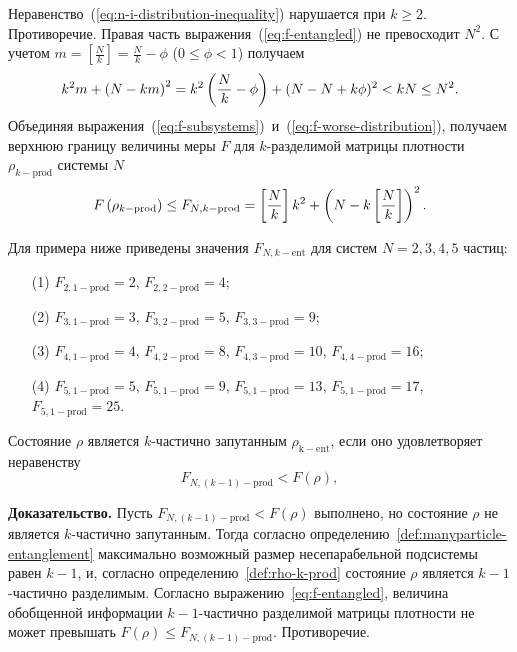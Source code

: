 %
Неравенство~(\ref{eq:n-i-distribution-inequality}) нарушается при $k \geq 2$. Противоречие.
Правая часть выражения~(\ref{eq:f-entangled}) не превосходит $N^2$.
С учетом
$m = \left[\frac{N}{k}\right] = \frac{N}{k} -\phi$ ($0 \leq \phi < 1$)
получаем
%
\begin{equation}
  k^2m + \left( N-km \right)^2
  = k^2\left(\frac{N}{k} - \phi\right) + (N - N +k\phi)^2  < kN \leq N^2.
\end{equation}
%
Объединяя выражения~(\ref{eq:f-subsystems})~и~(\ref{eq:f-worse-distribution}),
получаем верхнюю границу величины меры $F$ для $k$-разделимой матрицы плотности $\rho_{k-\mathrm{prod}}$ системы $N$
%
\begin{equation}\label{eq:f-entangled}
  F\left( \rho_{k-\mathrm{prod}} \right)
  \leq F_{N, k-\mathrm{prod}}
  = \left[ \frac N k \right] k^2 + \left(N - k \left[ \frac N k \right]\right)^2.
\end{equation}
%


Для примера ниже приведены значения $F_{N, k-\mathrm{ent}}$
для систем $N = 2, 3, 4, 5$ частиц:
\begin{itemize}
  \item[(1)]
    $F_{2, 1-\mathrm{prod}}= 2$,
    $F_{2, 2-\mathrm{prod}}= 4$;
  \item[(2)]
    $F_{3, 1-\mathrm{prod}}= 3$,
    $F_{3, 2-\mathrm{prod}}= 5$,
    $F_{3, 3-\mathrm{prod}}= 9$;
  \item[(3)]
    $F_{4, 1-\mathrm{prod}}= 4$,
    $F_{4, 2-\mathrm{prod}}= 8$,
    $F_{4, 3-\mathrm{prod}}= 10$,
    $F_{4, 4-\mathrm{prod}}= 16$;
  \item[(4)]
    $F_{5, 1-\mathrm{prod}}= 5$,
    $F_{5, 1-\mathrm{prod}}= 9$,
    $F_{5, 1-\mathrm{prod}}= 13$,
    $F_{5, 1-\mathrm{prod}}= 17$,
    $F_{5, 1-\mathrm{prod}}= 25$.
\end{itemize}


\begin{theorem}\label{th:entanglement-criteria}
  Состояние $\rho$ является $k$-частично запутанным $\rho_\mathrm{k-ent}$,
  если оно удовлетворяет неравенству
  \begin{equation}\label{eq:entanglement-criteria}
    F_{N, (k-1)-\mathrm{prod}} < F(\rho),
  \end{equation}
\end{theorem}
\textbf{Доказательство.}
Пусть $F_{N, (k-1)-\mathrm{prod}} < F(\rho)$ выполнено,
но состояние $\rho$ не является $k$-частично запутанным.
Тогда согласно определению~\ref{def:manyparticle-entanglement} максимально возможный размер несепарабельной подсистемы равен  $k-1$,
и,
согласно определению~\ref{def:rho-k-prod} состояние $\rho$ является $k-1$-частично разделимым.
Согласно выражению~\ref{eq:f-entangled}, величина обобщенной информации $k-1$-частично разделимой матрицы плотности не может превышать $F(\rho) \leq F_{N, (k-1)-\mathrm{prod}}$.
Противоречие.

